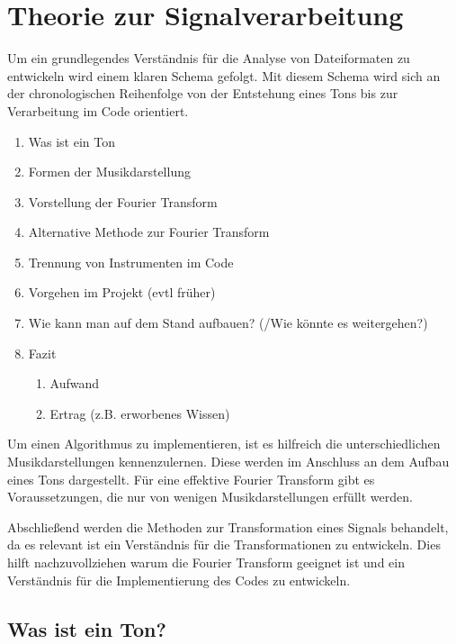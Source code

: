 \chapter{Theorie zur Signalverarbeitung}
\label{theorie}
%


Um ein grundlegendes Verständnis für die Analyse von Dateiformaten zu entwickeln wird einem klaren Schema gefolgt. Mit diesem Schema wird sich an der chronologischen Reihenfolge von der Entstehung eines Tons bis zur Verarbeitung im Code orientiert.

%
\begin{enumerate}
    \item Was ist ein Ton
    \item Formen der Musikdarstellung
    \item Vorstellung der Fourier Transform
    \item Alternative Methode zur Fourier Transform
    \item Trennung von Instrumenten im Code
    \item Vorgehen im Projekt (evtl früher)
    \item Wie kann man auf dem Stand aufbauen? (/Wie könnte es weitergehen?)
    \item Fazit
    \begin{enumerate}
        \item Aufwand
        \item Ertrag (z.B. erworbenes Wissen)
    \end{enumerate}
\end{enumerate}
%

Um einen Algorithmus zu implementieren, ist es hilfreich die unterschiedlichen Musikdarstellungen kennenzulernen. Diese werden im Anschluss an dem Aufbau eines Tons dargestellt. Für eine effektive Fourier Transform gibt es Voraussetzungen, die nur von wenigen Musikdarstellungen erfüllt werden.

\par

Abschließend werden die Methoden zur Transformation eines Signals behandelt, da es relevant ist ein Verständnis für die Transformationen zu entwickeln. Dies hilft nachzuvollziehen warum die Fourier Transform geeignet ist und ein Verständnis für die Implementierung des Codes zu entwickeln.

%
\section{Was ist ein Ton?}
\label{sounds}
%

